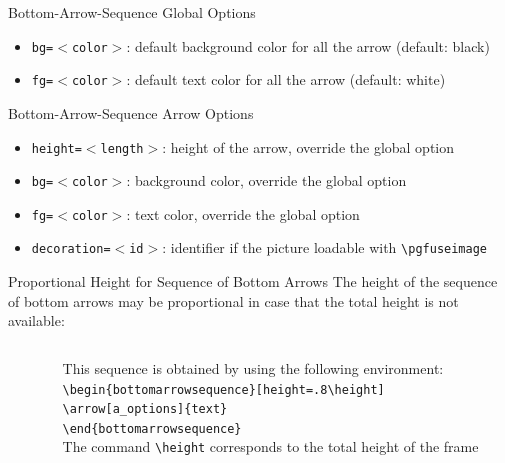 \documentclass[english,sectioncirclenumberstyle]{ciadbeamer}
\begin{document}
\begin{frame}{{Bottom-Arrow-Sequence} Global Options \insertcontinuationtext}
	\begin{itemize}
	\item \texttt{bg=\ensuremath{<}color\ensuremath{>}}: default background color for all the arrow (default: black)
	\item \texttt{fg=\ensuremath{<}color\ensuremath{>}}: default text color for all the arrow (default: white)
	\end{itemize}
\end{frame}

\begin{frame}{{Bottom-Arrow-Sequence} Arrow Options}
	\begin{itemize}
	\item \texttt{height=\ensuremath{<}length\ensuremath{>}}: height of the arrow, override the global option
	\item \texttt{bg=\ensuremath{<}color\ensuremath{>}}: background color, override the global option
	\item \texttt{fg=\ensuremath{<}color\ensuremath{>}}: text color, override the global option
	\item \texttt{decoration=\ensuremath{<}id\ensuremath{>}}: identifier if the picture loadable with \texttt{{\textbackslash}pgfuseimage}
	\end{itemize}
\end{frame}

\begin{frame}[t]{{Proportional Height} for Sequence of Bottom Arrows}
	The height of the sequence of bottom arrows may be proportional in case that the total height is not available:
	\vspace{.5cm}
	\begin{columns}
		\begin{column}{.2\linewidth}
			\begin{bottomarrowsequence}[height=.8\height]
			\end{bottomarrowsequence} \\[.5cm]
		\end{column}
		\begin{column}{.8\linewidth}
			This sequence is obtained by using the following environment: \\
			\texttt{{\textbackslash}begin\{bottomarrowsequence\}[height=.8{\textbackslash}height]} \\
			\hspace{.5cm}\texttt{{\textbackslash}arrow[a\_options]\{text\}} \\
			\texttt{{\textbackslash}end\{bottomarrowsequence\}} \\[.5cm]
			The command \texttt{{\textbackslash}height} corresponds to the total height of the frame
		\end{column}
	\end{columns}
\end{frame}
\end{document}
